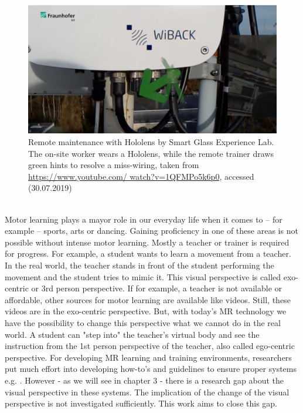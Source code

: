 \begin{figure}
	\centering
	\includegraphics[width=1.0\textwidth]{img/fraunhofer.PNG}
	\caption{Remote maintenance with Hololens by Smart Glass Experience Lab. The on-site worker wears a Hololens, while the remote trainer draws green hints to resolve a miss-wiring, taken from \hyperlink{https://www.youtube.com/watch?v=1QFMPo5k6p0}{https://www.youtube.com/ watch?v=1QFMPo5k6p0}, accessed (30.07.2019)}
	\label{fig:fraunhofer}
\end{figure}\\
Motor learning plays a mayor role in our everyday life when it comes to \--- for example \--- sports, arts or dancing. Gaining proficiency in one of these areas is not possible without intense motor learning. Mostly a teacher or trainer is required for progress. For example, a student wants to learn a movement from a teacher. In the real world, the teacher stands in front of the student performing the movement and the student tries to mimic it. This visual perspective is called exo-centric or 3rd person perspective. If for example, a teacher is not available or affordable, other sources for motor learning are available like videos. Still, these videos are in the exo-centric perspective. But, with today's MR technology we have the possibility to change this perspective what we cannot do in the real world. A student can "step into" the teacher's virtual body and see the instruction from the 1st person perspective of the teacher, also called ego-centric perspective. For developing MR learning and training environments, researchers put much effort into developing how-to's and guidelines to ensure proper systems e.g. \cite{LaViola2017}. However - as we will see in chapter 3 - there is a research gap about the visual perspective in these systems. The implication of the change of the visual perspective is not investigated sufficiently. This work aims to close this gap. 
